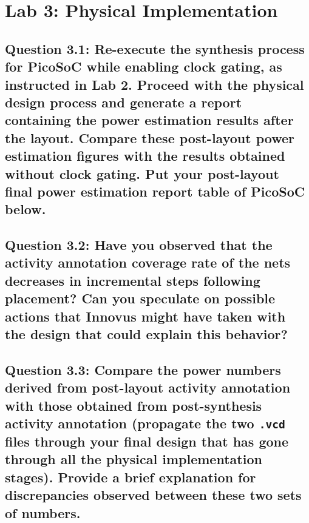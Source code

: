 \documentclass{article}
\begin{document}
\begin{tcolorbox}[colback=white, colframe=black, width=\textwidth, height=0.5\textheight, title=Answer 2.3]
\end{tcolorbox}

\newpage

\section{Lab 3: Physical Implementation}

\subsection*{Question 3.1: Re-execute the synthesis process for PicoSoC while enabling clock gating, as instructed in Lab 2. Proceed with the physical design process and generate a report containing the power estimation results after the layout. Compare these post-layout power estimation figures with the results obtained without clock gating. Put your post-layout final power estimation report table of PicoSoC below.}

\begin{tcolorbox}[colback=white, colframe=black, width=\textwidth, height=0.5\textheight, title=Answer 3.1]
\end{tcolorbox}

\newpage
\subsection*{Question 3.2: Have you observed that the activity annotation coverage rate of the nets decreases in incremental steps following placement? Can you speculate on possible actions that Innovus might have taken with the design that could explain this behavior?}

\begin{tcolorbox}[colback=white, colframe=black, width=\textwidth, height=0.35\textheight, title=Answer 3.2]
\end{tcolorbox}

\subsection*{Question 3.3: Compare the power numbers derived from post-layout activity annotation with those obtained from post-synthesis activity annotation (propagate the two \texttt{.vcd} files through your final design that has gone through all the physical implementation stages). Provide a brief explanation for discrepancies observed between these two sets of numbers.}

\begin{tcolorbox}[colback=white, colframe=black, width=\textwidth, height=0.35\textheight, title=Answer 3.3]
\end{tcolorbox}
\end{document}
